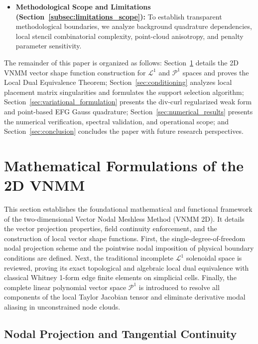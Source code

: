 \documentclass[preprint,12pt]{elsarticle}
\begin{document}
\begin{itemize}
    \item \textbf{Methodological Scope and Limitations (Section~\ref{subsec:limitations_scope}):} 
    To establish transparent methodological boundaries, we analyze background quadrature dependencies, local stencil combinatorial complexity, point-cloud anisotropy, and penalty parameter sensitivity.
\end{itemize}

The remainder of this paper is organized as follows: Section~\ref{sec:formulations} details the 2D VNMM vector shape function construction for $\mathcal{L}^1$ and $\mathcal{P}^1$ spaces and proves the Local Dual Equivalence Theorem; Section~\ref{sec:conditioning} analyzes local placement matrix singularities and formulates the support selection algorithm; Section~\ref{sec:variational_formulation} presents the div-curl regularized weak form and point-based EFG Gauss quadrature; Section~\ref{sec:numerical_results} presents the numerical verification, spectral validation, and operational scope; and Section~\ref{sec:conclusion} concludes the paper with future research perspectives.

\section{Mathematical Formulations of the 2D VNMM}
\label{sec:formulations}

This section establishes the foundational mathematical and functional framework of the two-dimensional Vector Nodal Meshless Method (VNMM 2D). It details the vector projection properties, field continuity enforcement, and the construction of local vector shape functions. First, the single-degree-of-freedom nodal projection scheme and the pointwise nodal imposition of physical boundary conditions are defined. Next, the traditional incomplete $\mathcal{L}^1$ solenoidal space is reviewed, proving its exact topological and algebraic local dual equivalence with classical Whitney 1-form edge finite elements on simplicial cells. Finally, the complete linear polynomial vector space $\mathcal{P}^1$ is introduced to resolve all components of the local Taylor Jacobian tensor and eliminate derivative modal aliasing in unconstrained node clouds.

\subsection{Nodal Projection and Tangential Continuity}
\label{subsec:nodal_projection}
\end{document}
